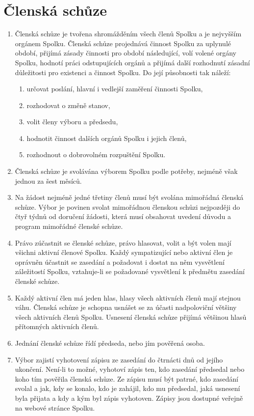 \documentclass[11pt,a4paper]{article}
\begin{document}
\section{Členská schůze}
\begin{enumerate}[itemsep=0pt]
    \item Členská schůze je tvořena shromážděním všech členů Spolku a je 
    nejvyšším orgánem Spolku. Členská schůze projednává činnost Spolku 
    za uplynulé období, přijímá zásady činnosti pro období následující, 
    volí volené orgány Spolku, hodnotí práci odstupujících orgánů a přijímá 
    další rozhodnutí zásadní důležitosti pro existenci a činnost Spolku. 
    Do její působnosti tak náleží: 
    \begin{enumerate}[itemsep=0pt,topsep=0pt]
        \item určovat poslání, hlavní i vedlejší zaměření činnosti Spolku,
        \item rozhodovat o změně stanov,
        \item volit členy výboru a předsedu,
        \item hodnotit činnost dalších orgánů Spolku i jejich členů,
        \item rozhodnout o dobrovolném rozpuštění Spolku.
    \end{enumerate}
    \item Členská schůze je svolávána výborem Spolku podle potřeby, nejméně 
    však jednou za šest měsíců.
    \item Na žádost nejméně jedné třetiny členů musí být svolána mimořádná 
    členská schůze. Výbor je povinen svolat mimořádnou členskou schůzi 
    nejpozději do čtyř týdnů od doručení žádosti, která musí obsahovat uvedení 
    důvodu a program mimořádné členské schůze.
    \item Právo zúčastnit se členské schůze, právo hlasovat, volit a být volen 
    mají všichni aktivní členové Spolku. Každý sympatizující nebo aktivní člen 
    je oprávněn účastnit se zasedání a požadovat i dostat na něm vysvětlení 
    záležitostí Spolku, vztahuje-li se požadované vysvětlení k předmětu zasedání
    členské schůze.
    \item Každý aktivní člen má jeden hlas, hlasy všech aktivních členů mají 
    stejnou váhu. Členská schůze je schopna usnášet se za účasti nadpoloviční 
    většiny všech aktivních členů Spolku. Usnesení členská schůze přijímá 
    většinou hlasů přítomných aktivních členů. 
    \item Jednání členské schůze řídí předseda, nebo jím pověřená osoba.
    \item Výbor zajistí vyhotovení zápisu ze zasedání do čtrnácti dnů od jejího 
    ukončení. Není-li to možné, vyhotoví zápis ten, kdo zasedání předsedal nebo 
    koho tím pověřila členská schůze. Ze zápisu musí být patrné, kdo zasedání 
    svolal a jak, kdy se konalo, kdo je zahájil, kdo mu předsedal, jaká usnesení
    byla přijata a kdy a kým byl zápis vyhotoven. Zápisy jsou dostupné veřejně 
    na webové stránce Spolku.
\end{enumerate}
\end{document}
